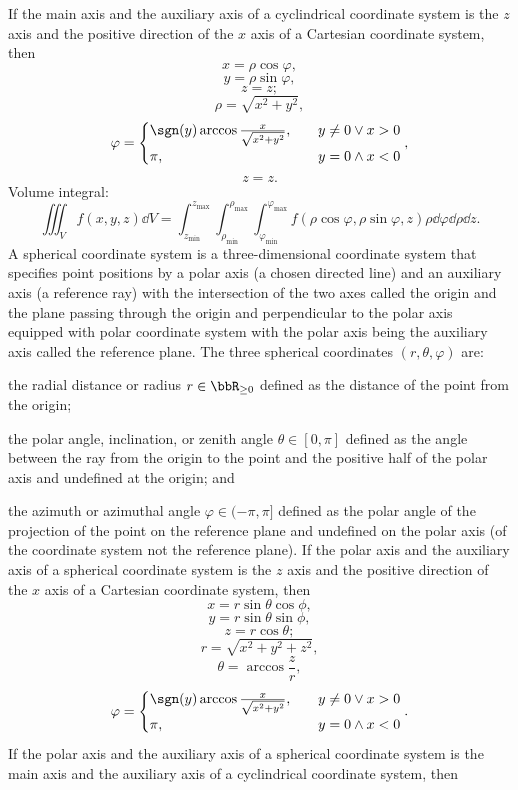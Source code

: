 \documentclass[a4paper,12pt]{report}
\begin{document}
\eit
If the main axis and the auxiliary axis of a cyclindrical coordinate system is the $z$ axis and the positive direction of the $x$ axis of a Cartesian coordinate system, then
\[x=\rho\cos\varphi,\]
\[y=\rho\sin\varphi,\]
\[z=z;\]
\[\rho=\sqrt{x^2+y^2},\]
\[\varphi=\begin{cases}\sgn(y)\arccos\frac{x}{\sqrt{x^2+y^2}},\quad&y\neq 0\lor x>0\\\pi,\quad&y=0\land x<0\end{cases},\]
\[z=z.\]
Volume integral:
\[\iiint_Vf(x,y,z)\dd{V}=\int_{z_\text{min}}^{z_\text{max}}\int_{\rho_\text{min}}^{\rho_\text{max}}\int_{\varphi_\text{min}}^{\varphi_\text{max}}f(\rho\cos\varphi,\rho\sin\varphi,z)\rho\dd{\varphi}\dd{\rho}\dd{z}.\]
A spherical coordinate system is a three-dimensional coordinate system that specifies point positions by a polar axis (a chosen directed line) and an auxiliary axis (a reference ray) with the intersection of the two axes called the origin and the plane passing through the origin and perpendicular to the polar axis equipped with polar coordinate system with the polar axis being the auxiliary axis called the reference plane. The three spherical coordinates $(r,\theta,\varphi)$ are:
\bit
\item the radial distance or radius $r\in\bbR_{\geq 0}$ defined as the distance of the point from the origin;
\item the polar angle, inclination, or zenith angle $\theta\in[0,\pi]$ defined as the angle between the ray from the origin to the point and the positive half of the polar axis and undefined at the origin; and
\item the azimuth or azimuthal angle $\varphi\in(-\pi,\pi]$ defined as the polar angle of the projection of the point on the reference plane and undefined on the polar axis (of the coordinate system not the reference plane).
\eit
If the polar axis and the auxiliary axis of a spherical coordinate system is the $z$ axis and the positive direction of the $x$ axis of a Cartesian coordinate system, then
\[x=r\sin\theta\cos\phi,\]
\[y=r\sin\theta\sin\phi,\]
\[z=r\cos\theta;\]
\[r=\sqrt{x^2+y^2+z^2},\]
\[\theta=\arccos\frac{z}{r},\]
\[\varphi=\begin{cases}\sgn(y)\arccos\frac{x}{\sqrt{x^2+y^2}},\quad&y\neq 0\lor x>0\\\pi,\quad&y=0\land x<0\end{cases}.\]
If the polar axis and the auxiliary axis of a spherical coordinate system is the main axis and the auxiliary axis of a cyclindrical coordinate system, then
\end{document}

